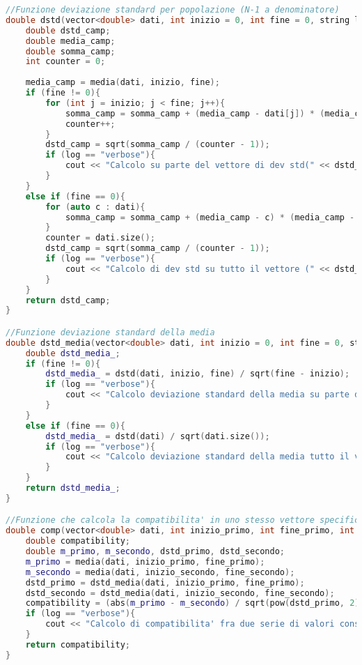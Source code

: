 \documentclass[a4paper,11pt,oneside]{article}
\begin{document}
\begin{lstlisting}[language=C++, label=lst:statistica.h, caption=statistica.h]
//Funzione deviazione standard per popolazione (N-1 a denominatore)
double dstd(vector<double> dati, int inizio = 0, int fine = 0, string log = ""){
    double dstd_camp;
    double media_camp;
    double somma_camp;
    int counter = 0;
    
    media_camp = media(dati, inizio, fine);
    if (fine != 0){
        for (int j = inizio; j < fine; j++){
            somma_camp = somma_camp + (media_camp - dati[j]) * (media_camp - dati[j]);
            counter++;
        }
        dstd_camp = sqrt(somma_camp / (counter - 1));
        if (log == "verbose"){
            cout << "Calcolo su parte del vettore di dev std(" << dstd_camp << ")" << endl;
        }
    }
    else if (fine == 0){
        for (auto c : dati){
            somma_camp = somma_camp + (media_camp - c) * (media_camp - c);
        }
        counter = dati.size();
        dstd_camp = sqrt(somma_camp / (counter - 1));
        if (log == "verbose"){
            cout << "Calcolo di dev std su tutto il vettore (" << dstd_camp << ")" << endl;
        }
    }
    return dstd_camp;
}

//Funzione deviazione standard della media
double dstd_media(vector<double> dati, int inizio = 0, int fine = 0, string log = ""){
    double dstd_media_;
    if (fine != 0){
        dstd_media_ = dstd(dati, inizio, fine) / sqrt(fine - inizio);
        if (log == "verbose"){
            cout << "Calcolo deviazione standard della media su parte del vettore (" << dstd_media_ << ")" << endl;
        }
    }
    else if (fine == 0){
        dstd_media_ = dstd(dati) / sqrt(dati.size());
        if (log == "verbose"){
            cout << "Calcolo deviazione standard della media tutto il vettore (" << dstd_media_ << ")" << endl;
        }
    }
    return dstd_media_;
}

//Funzione che calcola la compatibilita' in uno stesso vettore specificando inizio e fine di ciascuno dei due intervalli (|a-b|/sqrt(sigma_a^2+sigma_b^2) )
double comp(vector<double> dati, int inizio_primo, int fine_primo, int inizio_secondo, int fine_secondo, string log = ""){
    double compatibility;
    double m_primo, m_secondo, dstd_primo, dstd_secondo;
    m_primo = media(dati, inizio_primo, fine_primo);
    m_secondo = media(dati, inizio_secondo, fine_secondo);
    dstd_primo = dstd_media(dati, inizio_primo, fine_primo);
    dstd_secondo = dstd_media(dati, inizio_secondo, fine_secondo);
    compatibility = (abs(m_primo - m_secondo) / sqrt(pow(dstd_primo, 2) + pow(dstd_secondo, 2)));
    if (log == "verbose"){
        cout << "Calcolo di compatibilita' fra due serie di valori consecutivi nel vettore (" << compatibility << ") ATTENZIONE CHE QUI SI DEVE USARE LA SIGMA RIFERITA ALLA MISURA" << endl;
    }
    return compatibility;
}


\end{lstlisting}
\end{document}
